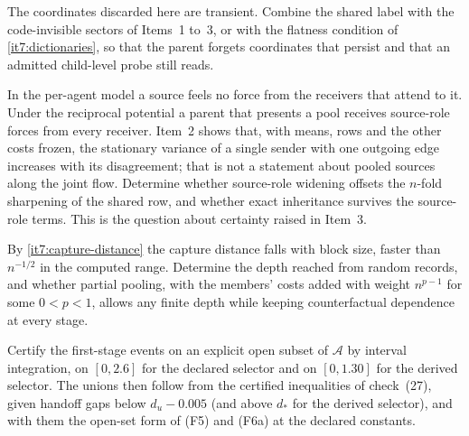 \documentclass[11pt,letterpaper]{report}
\begin{document}
The coordinates discarded here are transient. Combine the shared label with the code-invisible sectors of Items~1 to~3, or with the flatness condition of \cref{it7:dictionaries}, so that the parent forgets coordinates that persist and that an admitted child-level probe still reads.

In the per-agent model a source feels no force from the receivers that attend to it. Under the reciprocal potential a parent that presents a pool receives source-role forces from every receiver. Item~2 shows that, with means, rows and the other costs frozen, the stationary variance of a single sender with one outgoing edge increases with its disagreement; that is not a statement about pooled sources along the joint flow. Determine whether source-role widening offsets the $n$-fold sharpening of the shared row, and whether exact inheritance survives the source-role terms. This is the question about certainty raised in Item~3.

By \cref{it7:capture-distance} the capture distance falls with block size, faster than $n^{-1/2}$ in the computed range. Determine the depth reached from random records, and whether partial pooling, with the members' costs added with weight $n^{p-1}$ for some $0<p<1$, allows any finite depth while keeping counterfactual dependence at every stage.

Certify the first-stage events on an explicit open subset of $\mathcal A$ by interval integration, on $[0,2.6]$ for the declared selector and on $[0,1.30]$ for the derived selector. The unions then follow from the certified inequalities of check~(27), given handoff gaps below $d_u-0.005$ (and above $d_*$ for the derived selector), and with them the open-set form of (F5) and (F6a) at the declared constants.

\begingroup
\small
\setlength{\bibsep}{3pt}


\endgroup
\end{document}
